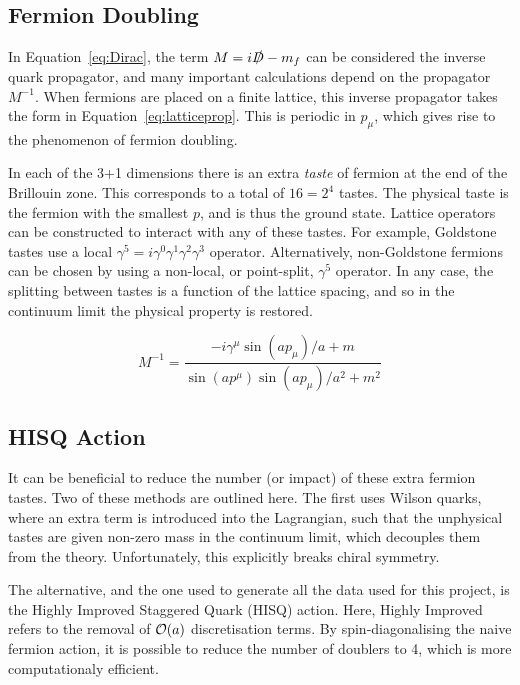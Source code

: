 \documentclass[a4paper,12pt]{article}
\begin{document}
\subsection{Fermion Doubling}
In Equation~\ref{eq:Dirac}, the term $M = i\slashed{D} -m_f$ can be considered the inverse quark propagator, and many important calculations depend on the propagator $M^{-1}$. When fermions are placed on a finite lattice, this inverse propagator takes the form in Equation~\ref{eq:latticeprop}\cite{2016Chakraborty}. This is periodic in $p_\mu$, which gives rise to the phenomenon of fermion doubling.

In each of the 3+1 dimensions there is an extra \emph{taste} of fermion at the end of the Brillouin zone. This corresponds to a total of $16=2^4$ tastes. The physical taste is the fermion with the smallest $p$, and is thus the ground state. Lattice operators can be constructed to interact with any of these tastes. For example, Goldstone tastes use a local $\gamma^5=i \gamma^0\gamma^1\gamma^2\gamma^3$ operator. Alternatively, non-Goldstone fermions can be chosen by using a non-local, or point-split, $\gamma^5$ operator. In any case, the splitting between tastes is a function of the lattice spacing, and so in the continuum limit the physical property is restored.

\begin{equation}
    \label{eq:latticeprop}
    M^{-1} = \frac{-i\gamma^\mu \sin(ap_\mu)/a+m}{\sin(ap^\mu)\sin(ap_\mu)/a^2 + m^2}
\end{equation}

\subsection{HISQ Action}
It can be beneficial to reduce the number (or impact) of these extra fermion tastes. Two of these methods are outlined here. The first uses Wilson quarks\cite{2016Chakraborty}, where an extra term is introduced into the Lagrangian, such that the unphysical tastes are given non-zero mass in the continuum limit, which decouples them from the theory. Unfortunately, this explicitly breaks chiral symmetry.

The alternative, and the one used to generate all the data used for this project, is the Highly Improved Staggered Quark (HISQ) action. Here, Highly Improved refers to the removal of $\order{a}$ discretisation terms. By spin-diagonalising the naive fermion action, it is possible to reduce the number of doublers to 4, which is more computationaly efficient.
\end{document}
